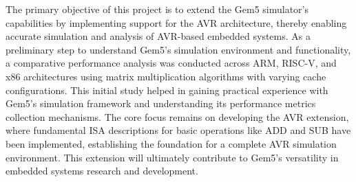 The primary objective of this project is to extend the Gem5 simulator's capabilities by implementing support for the AVR architecture, thereby enabling accurate simulation and analysis of AVR-based embedded systems. As a preliminary step to understand Gem5's simulation environment and functionality, a comparative performance analysis was conducted across ARM, RISC-V, and x86 architectures using matrix multiplication algorithms with varying cache configurations. This initial study helped in gaining practical experience with Gem5's simulation framework and understanding its performance metrics collection mechanisms. The core focus remains on developing the AVR extension, where fundamental ISA descriptions for basic operations like ADD and SUB have been implemented, establishing the foundation for a complete AVR simulation environment. This extension will ultimately contribute to Gem5's versatility in embedded systems research and development.